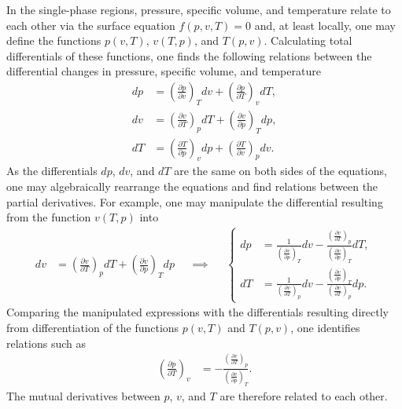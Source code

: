 In the single-phase regions, pressure, specific volume, and temperature relate to each other via the surface equation $f(p,v,T)=0$ and, at least locally, one may define the functions $p(v,T)$, $v(T,p)$, and $T(p,v)$. Calculating total differentials of these functions, one finds the following relations between the differential changes in pressure, specific volume, and temperature
\begin{align}
    dp&=\left(\frac{\partial p}{\partial v}\right)_Tdv+\left(\frac{\partial p}{\partial T}\right)_v dT,\\
    dv&=\left(\frac{\partial v}{\partial T}\right)_pdT+\left(\frac{\partial v}{\partial p}\right)_T dp,\\
    dT&=\left(\frac{\partial T}{\partial p}\right)_vdp+\left(\frac{\partial T}{\partial v}\right)_p dv.
\end{align}
As the differentials $dp$, $dv$, and $dT$ are the same on both sides of the equations, one may algebraically rearrange the equations and find relations between the partial derivatives. For example, one may manipulate the differential resulting from the function $v(T,p)$ into
\begin{align}
    dv&=\left(\frac{\partial v}{\partial T}\right)_pdT+\left(\frac{\partial v}{\partial p}\right)_T dp & &\implies & &\left\{\begin{aligned}
    dp&=\frac{1}{\left(\frac{\partial v}{\partial p}\right)_T}dv-\frac{\left(\frac{\partial v}{\partial T}\right)_p}{\left(\frac{\partial v}{\partial p}\right)_T}dT,\\
    dT&=\frac{1}{\left(\frac{\partial v}{\partial T}\right)_p}dv-\frac{\left(\frac{\partial v}{\partial p}\right)_T }{\left(\frac{\partial v}{\partial T}\right)_p}dp.\end{aligned}\right.
\end{align}
Comparing the manipulated expressions with the differentials resulting directly from differentiation of the functions $p(v,T)$ and $T(p,v)$, one identifies relations such as
\begin{align}
    \left(\frac{\partial p}{\partial T}\right)_v&=-\frac{\left(\frac{\partial v}{\partial T}\right)_p}{\left(\frac{\partial v}{\partial p}\right)_T}.
\end{align}
The mutual derivatives between $p$, $v$, and $T$ are therefore related to each other.

